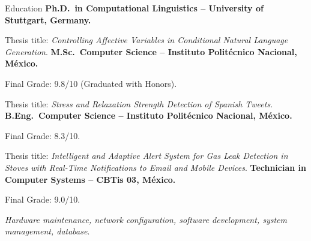 \begin{rubric}{Education}
\entry*[2021 -- 2024 ]%
	\textbf{Ph.D.~in Computational Linguistics -- University of Stuttgart, Germany.} \par
    Thesis title: \textit{Controlling Affective Variables in Conditional Natural Language Generation}.
%
\entry*[2015 -- 2017]%
	\textbf{M.Sc.~Computer Science -- Instituto Politécnico Nacional, México.}\par
    Final Grade: 9.8/10 (Graduated with Honors).\par
	Thesis title: \textit{Stress and Relaxation Strength Detection of Spanish Tweets}.
% 
\entry*[2011 -- 2015]%
	\textbf{B.Eng.~Computer Science -- Instituto Politécnico Nacional, México.}\par
    Final Grade: 8.3/10.\par
	Thesis title: \textit{Intelligent and Adaptive Alert System for Gas Leak Detection in Stoves with Real-Time Notifications to Email and Mobile Devices}.
%
\entry*[2008 -- 2011]%
    \textbf{Technician in Computer Systems -- CBTis 03, México.}\par
    Final Grade: 9.0/10.\par
	\textit{Hardware maintenance, network configuration, software development, system management, database}.
\end{rubric}